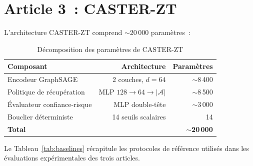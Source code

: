 \section*{Article 3~: CASTER-ZT}

L'architecture CASTER-ZT comprend $\sim$20\,000 paramètres~:

\begin{table}[htb]
\centering
\caption{Décomposition des paramètres de CASTER-ZT}
\label{tab:casterzt-params}
\begin{tabular}{lrr}
\toprule
\textbf{Composant} & \textbf{Architecture} & \textbf{Paramètres} \\
\midrule
Encodeur GraphSAGE & 2 couches, $d{=}64$ & $\sim$8\,400 \\
Politique de récupération & MLP $128 \to 64 \to |\mathcal{A}|$ & $\sim$8\,500 \\
Évaluateur confiance-risque & MLP double-tête & $\sim$3\,000 \\
Bouclier déterministe & 14 seuils scalaires & 14 \\
\midrule
\textbf{Total} & & $\sim$\textbf{20\,000} \\
\bottomrule
\end{tabular}
\end{table}


\label{ann:baselines}

Le Tableau~\ref{tab:baselines} récapitule les protocoles de référence utilisés dans les évaluations expérimentales des trois articles.

